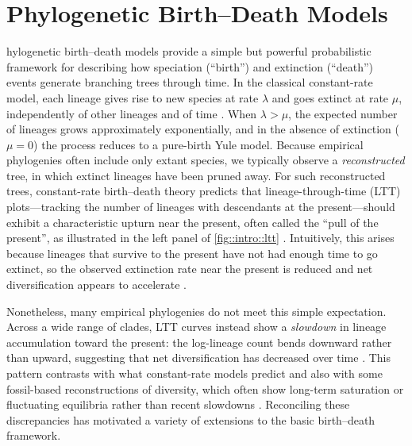 \section{Phylogenetic Birth--Death Models}
hylogenetic birth--death models provide a simple but powerful probabilistic framework for describing how speciation (``birth'') and extinction (``death'') events generate branching trees through time. In the classical constant-rate model, each lineage gives rise to new species at rate $\lambda$ and goes extinct at rate $\mu$, independently of other lineages and of time \citep{nee_extinction_1994,nee_reconstructed_1994,nee_birth-death_2006}. When $\lambda>\mu$, the expected number of lineages grows approximately exponentially, and in the absence of extinction ($\mu=0$) the process reduces to a pure-birth Yule model. Because empirical phylogenies often include only extant species, we typically observe a \emph{reconstructed} tree, in which extinct lineages have been pruned away. For such reconstructed trees, constant-rate birth--death theory predicts that lineage-through-time (LTT) plots---tracking the number of lineages with descendants at the present---should exhibit a characteristic upturn near the present, often called the ``pull of the present'', as illustrated in the left panel of \autoref{fig::intro::ltt} \citep{kubo_inferring_1995,nee_extinction_1994,stadler_decoding_2024}. Intuitively, this arises because lineages that survive to the present have not had enough time to go extinct, so the observed extinction rate near the present is reduced and net diversification appears to accelerate \citep{etienne_diversity-dependence_2012}.



Nonetheless, many empirical phylogenies do not meet this simple expectation. Across a wide range of clades, LTT curves instead show a \emph{slowdown} in lineage accumulation toward the present: the log-lineage count bends downward rather than upward, suggesting that net diversification has decreased over time \citep{purvis_phylogenetic_2008,phillimore_density-dependent_2008,moen_why_2014,aguilee_clade_2018}. This pattern contrasts with what constant-rate models predict and also with some fossil-based reconstructions of diversity, which often show long-term saturation or fluctuating equilibria rather than recent slowdowns \citep{etienne_diversity-dependence_2012,louca_why_2021}. Reconciling these discrepancies has motivated a variety of extensions to the basic birth--death framework.

